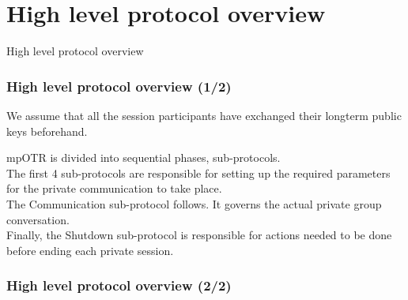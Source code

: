 \section{High level protocol overview}
\begin{frame}
\Huge{\centerline{High level protocol overview}}
\end{frame}

\begin{frame}
  \frametitle{High level protocol overview (1/2)}
  We assume that all the session participants have exchanged their longterm public keys beforehand.

  mpOTR is divided into sequential phases, sub-protocols.\\[0.3cm]

  The first 4 sub-protocols are responsible for setting up the required parameters for the private communication to take place.\\[0.3cm]

  The Communication sub-protocol follows. It governs the actual private group conversation.\\[0.3cm]

  Finally, the Shutdown sub-protocol is responsible for actions needed to be done before ending each private session.\\[0.3cm]

\end{frame}

\begin{frame}
  \frametitle{High level protocol overview (2/2)}

\end{frame}
